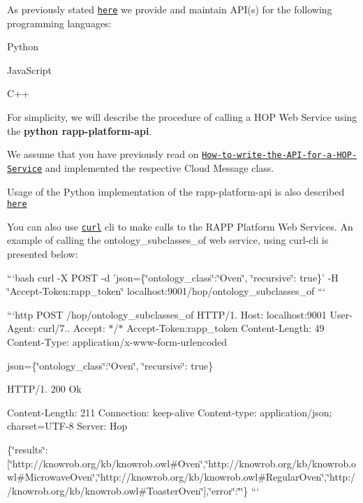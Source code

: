 As previously stated \href{https://github.com/rapp-project/rapp-platform/wiki/How-to-write-the-API-for-a-HOP-service%3F}{\tt here} we provide and maintain A\-P\-I(s) for the following programming languages\-:


\begin{DoxyItemize}
\item Python
\item Java\-Script
\item C++
\end{DoxyItemize}

For simplicity, we will describe the procedure of calling a H\-O\-P Web Service using the {\bfseries python rapp-\/platform-\/api}.

We assume that you have previously read on \href{https://github.com/rapp-project/rapp-platform/wiki/How-to-write-the-API-for-a-HOP-service%3F}{\tt How-\/to-\/write-\/the-\/\-A\-P\-I-\/for-\/a-\/\-H\-O\-P-\/\-Service} and implemented the respective Cloud Message class.

Usage of the Python implementation of the rapp-\/platform-\/api is also described \href{https://github.com/rapp-project/rapp-api/tree/master/python#calling-rapp-platform-services---api-usage}{\tt here}

You can also use \href{https://curl.haxx.se/}{\tt curl} cli to make calls to the R\-A\-P\-P Platform Web Services. An example of calling the {\ttfamily ontology\-\_\-subclasses\-\_\-of} web service, using {\ttfamily curl-\/cli} is presented below\-:

```bash curl -\/\-X P\-O\-S\-T -\/d 'json=\{\char`\"{}ontology\-\_\-class\char`\"{}\-:\char`\"{}\-Oven\char`\"{}, \char`\"{}recursive\char`\"{}\-: true\}' -\/\-H \char`\"{}\-Accept-\/\-Token\-:rapp\-\_\-token\char`\"{} localhost\-:9001/hop/ontology\-\_\-subclasses\-\_\-of ```

```http P\-O\-S\-T /hop/ontology\-\_\-subclasses\-\_\-of H\-T\-T\-P/1. Host\-: localhost\-:9001 User-\/\-Agent\-: curl/7.. Accept\-: $\ast$/$\ast$ Accept-\/\-Token\-:rapp\-\_\-token Content-\/\-Length\-: 49 Content-\/\-Type\-: application/x-\/www-\/form-\/urlencoded

json=\{\char`\"{}ontology\-\_\-class\char`\"{}\-:\char`\"{}\-Oven\char`\"{}, \char`\"{}recursive\char`\"{}\-: true\}

H\-T\-T\-P/1. 200 Ok

Content-\/\-Length\-: 211 Connection\-: keep-\/alive Content-\/type\-: application/json; charset=U\-T\-F-\/8 Server\-: Hop

\{\char`\"{}results\char`\"{}\-:\mbox{[}\char`\"{}http\-://knowrob.\-org/kb/knowrob.\-owl\#\-Oven\char`\"{},\char`\"{}http\-://knowrob.\-org/kb/knowrob.\-owl\#\-Microwave\-Oven\char`\"{},\char`\"{}http\-://knowrob.\-org/kb/knowrob.\-owl\#\-Regular\-Oven\char`\"{},\char`\"{}http\-://knowrob.\-org/kb/knowrob.\-owl\#\-Toaster\-Oven\char`\"{}\mbox{]},\char`\"{}error\char`\"{}\-:\char`\"{}\char`\"{}\} ``` 